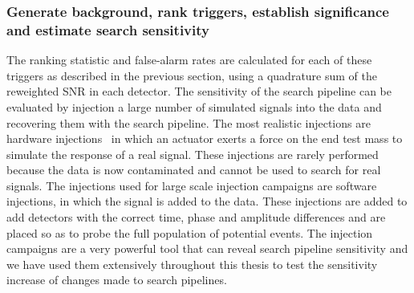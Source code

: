 \subsubsection{Generate background, rank triggers, establish significance and estimate search sensitivity}

The ranking statistic and false-alarm rates are calculated for each of these triggers as described in the previous section, using a quadrature sum of the reweighted SNR in each detector. The sensitivity of the search pipeline can be evaluated by injection a large number of simulated \gwadj signals into the data and recovering them with the search pipeline. The most realistic injections are hardware injections~\cite{Brown:2003, Biwer:2016} in which an actuator exerts a force on the end test mass to simulate the response of a real \gwadj signal. These injections are rarely performed because the data is now contaminated and cannot be used to search for real \gwadj signals. The injections used for large scale injection campaigns are software injections, in which the \gwadj signal is added to the data. These injections are added to add detectors with the correct time, phase and amplitude differences and are placed so as to probe the full population of potential \gwadj events. The injection campaigns are a very powerful tool that can reveal search pipeline sensitivity and we have used them extensively throughout this thesis to test the sensitivity increase of changes made to search pipelines.
